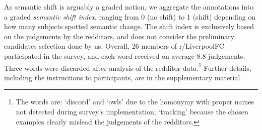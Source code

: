 As semantic shift is arguably a graded notion, we 
aggregate the annotations into a graded \emph{semantic shift index},
ranging from 0 (no shift) to 1 (shift) depending on how many subjects
spotted semantic change. The shift index is exclusively based
  on the judgements by the redditors, and does not consider the
  preliminary candidates selection done by us.  Overall, 26 members
of r/LiverpoolFC participated in the survey, and each word received on
average 8.8 judgements. Three words were discarded after analysis of
the redditor data.\footnote{The words are: `discord' and `owls' due to
  the homonymy with proper names not detected during survey's
  implementation; `tracking' because the chosen examples clearly
  mislead the judgements of the redditors.}  Further details,
including the instructions to participants, are in the supplementary
material.

